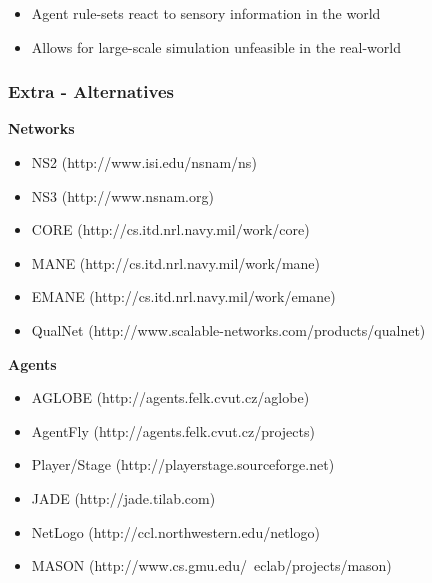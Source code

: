 \documentclass[mathserif,usenames,dvipsnames]{beamer}
\begin{document}
{\begin{itemize}
ased on beliefs
        \item Agent rule-sets react to sensory information in the world
        \item Allows for large-scale simulation unfeasible in the real-world
    \end{itemize}
}


\frame
{
    \frametitle{Extra - Alternatives}
    \footnotesize
    \textbf{Networks}
    \begin{itemize}
        \item NS2 (http://www.isi.edu/nsnam/ns)
        \item NS3 (http://www.nsnam.org)
        \item CORE (http://cs.itd.nrl.navy.mil/work/core)
        \item MANE (http://cs.itd.nrl.navy.mil/work/mane)
        \item EMANE (http://cs.itd.nrl.navy.mil/work/emane)
        \item QualNet (http://www.scalable-networks.com/products/qualnet)
    \end{itemize}

    \textbf{Agents}
    \begin{itemize}
        \item AGLOBE (http://agents.felk.cvut.cz/aglobe)
        \item AgentFly (http://agents.felk.cvut.cz/projects)
        \item Player/Stage (http://playerstage.sourceforge.net)
        \item JADE (http://jade.tilab.com)
        \item NetLogo (http://ccl.northwestern.edu/netlogo)
        \item MASON (http://www.cs.gmu.edu/~eclab/projects/mason)
    \end{itemize}
}
\end{document}
